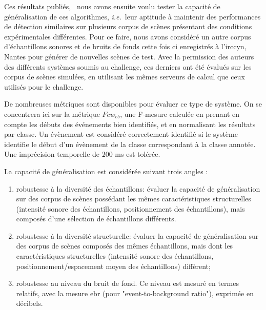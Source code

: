 Ces résultats publiés,~\cite{stowellhal-01253912} nous avons ensuite voulu tester la capacité de généralisation de ces algorithmes, \textit{i.e.}~leur aptitude à maintenir des performances de détection similaires sur plusieurs corpus de scènes présentant des conditions expérimentales différentes. Pour ce faire, nous avons considéré un autre corpus d'échantillons sonores et de bruits de fonds  cette fois ci enregistrés à l'irccyn, Nantes pour générer de nouvelles scènes de test. Avec la permission des auteurs des différents systèmes soumis au challenge, ces derniers ont été évalués sur les corpus de scènes simulées, en utilisant les mêmes serveurs de calcul que ceux utilisés pour le challenge.

De nombreuses métriques sont disponibles pour évaluer ce type de système. On se concentrera ici sur la métrique $Fcw_{eb}$, une F-mesure calculée en prenant en compte les débuts des événements bien identifiés, et en normalisant les résultats par classe. Un évènement est considéré correctement identifié si le système identifie le début d'un évènement de la classe correspondant à la classe annotée. Une imprécision temporelle de $200$ ms est tolérée.


La capacité de généralisation est considérée suivant trois angles :
\begin{enumerate}
  \item robustesse à la diversité des échantillons: évaluer la capacité de généralisation sur des corpus de scènes possédant les mêmes caractéristiques structurelles (intensité sonore des échantillons, positionnement des échantillons), mais composés d'une sélection de échantillons différents.
  \item robustesse à la diversité structurelle: évaluer la capacité de généralisation sur des corpus de scènes composés des mêmes échantillons, mais dont les caractéristiques structurelles (intensité sonore des échantillons, positionnement/espacement moyen des échantillons) diffèrent;
  \item robustesse au niveau du bruit de fond. Ce niveau est mesuré en termes relatifs, avec la mesure ebr (pour "event-to-background ratio"), exprimée en décibels.
\end{enumerate}

